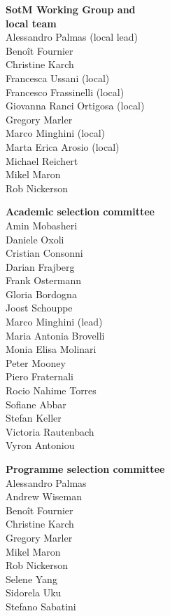 \newlength{\volunteerSpace}
\setlength{}
\RaggedRight
\begin{multicols}{2}
  \begin{small}
    \textbf{SotM Working Group and\\ local team}\\
    Alessandro Palmas (local lead)\\
    Benoît Fournier\\
    Christine Karch\\
    Francesca Ussani (local)\\
    Francesco Frassinelli (local)\\
    Giovanna Ranci Ortigosa (local)\\
    Gregory Marler\\
    Marco Minghini (local)\\
    Marta Erica Arosio (local)\\
    Michael Reichert\\
    Mikel Maron\\
    Rob Nickerson

    \vspace{\volunteerSpace}
    \textbf{Academic selection committee}\\
    Amin Mobasheri\\
    Daniele Oxoli\\
    Cristian Consonni\\
    Darian Frajberg\\
    Frank Ostermann\\
    Gloria Bordogna\\
    Joost Schouppe\\
    Marco Minghini (lead)\\
    Maria Antonia Brovelli\\
    Monia Elisa Molinari\\
    Peter Mooney\\
    Piero Fraternali\\
    Rocio Nahime Torres\\
    Sofiane Abbar\\
    Stefan Keller\\
    Victoria Rautenbach\\
    Vyron Antoniou

    \vspace{\volunteerSpace}
    \textbf{Programme selection \mbox{committee}}\\
    Alessandro Palmas\\
    Andrew Wiseman\\
    Benoît Fournier\\
    Christine Karch\\
    Gregory Marler\\
    Mikel Maron\\
    Rob Nickerson\\
    Selene Yang\\
    Sidorela Uku\\
    Stefano Sabatini\\


\end{small}
\end{multicols}
